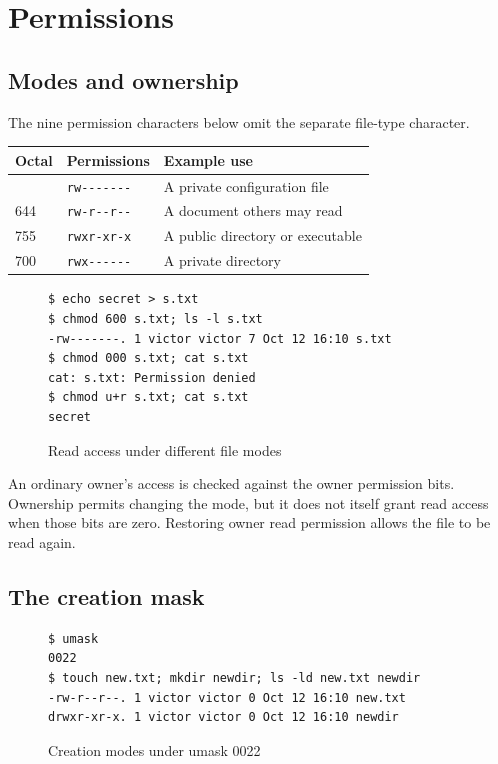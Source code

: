 \documentclass{../latex/utmreport}
\begin{document}
\chapter{Permissions}\label{permissions}

\section{Modes and ownership}\label{modes-and-ownership}

The nine permission characters below omit the separate file-type
character.

{
\begin{longtable}[]{@{}lll@{}}
\hline
Octal & Permissions & Example use \\
\hline
\endhead
\hline
\endlastfoot
600 & \texttt{rw-\/-\/-\/-\/-\/-\/-} & A private configuration file \\
644 & \texttt{rw-r-\/-r-\/-} & A document others may read \\
755 & \texttt{rwxr-xr-x} & A public directory or executable \\
700 & \texttt{rwx-\/-\/-\/-\/-\/-} & A private directory \\
\end{longtable}
}

\begin{figure}[H]
\begin{lstlisting}
$ echo secret > s.txt
$ chmod 600 s.txt; ls -l s.txt
-rw-------. 1 victor victor 7 Oct 12 16:10 s.txt
$ chmod 000 s.txt; cat s.txt
cat: s.txt: Permission denied
$ chmod u+r s.txt; cat s.txt
secret
\end{lstlisting}
\caption{Read access under different file modes}
\end{figure}

An ordinary owner's access is checked against the owner permission bits.
Ownership permits changing the mode, but it does not itself grant read
access when those bits are zero. Restoring owner read permission allows
the file to be read again.

\section{The creation mask}\label{the-creation-mask}

\begin{figure}[H]
\begin{lstlisting}
$ umask
0022
$ touch new.txt; mkdir newdir; ls -ld new.txt newdir
-rw-r--r--. 1 victor victor 0 Oct 12 16:10 new.txt
drwxr-xr-x. 1 victor victor 0 Oct 12 16:10 newdir
\end{lstlisting}
\caption{Creation modes under umask 0022}
\end{figure}
\end{document}
